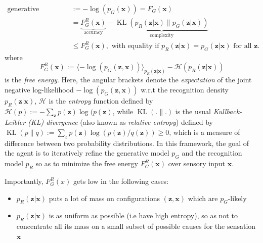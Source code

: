 \documentclass[10pt,letterpaper]{article}
\def\z{\mathbf{z}}
\def\x{\mathbf{x}}
\begin{document}
\begin{equation}
  \begin{split}
    \text{generative surprise } &:= -\log(p_G(\x)) = F_G(\x) \\
    &=\underbrace{F^R_G(\x)}_{\text{accuracy}} - \underbrace{\operatorname{{KL}}(p_R(\z|\x) \| p_G(\z|\x))}_{\text{complexity}} \\
    &\le F^R_G(\x),
    \text{ with equality if }p_R(\z|\x) = p_G(\z|\x)\text{ for all } \z.
  \end{split}
\end{equation}
where
\begin{equation}
  F_G^R(\x) := \langle -\log(p_G(\z, \x))\rangle_{p_R(\z|\x)} - \mathcal H(p_R(\z|\x))
\end{equation}
is the \textit{free energy}.
Here, the angular brackets denote the \textit{expectation} of the joint negative log-likelihood $-\log(p_G(\z, \x))$ w.r.t the recognition density $p_R(\z|\x)$, $\mathcal H$ is the \textit{entropy} function defined by $\mathcal H(p) := -\sum_{\z}p(\z)\log(p(\z)$, while $\operatorname{KL}(.\|.)$ is the usual \textit{Kullback-Leibler (KL) divergence} (also known as \textit{relative entropy}) defined by $\operatorname{KL}(p\|q) := \sum_{z}p(\z)\log(p(\z)/q(\z)) \ge 0$,
which is a measure of difference between two probability distributions. In this framework, the goal of the agent is to iteratively refine the generative model $p_G$ and the recognition model $p_R$ so as to minimize the free energy $F_G^R(\x)$ over sensory input $\x$.

Importantly, $F^R_G(x)$ gets low in the following cases:
\begin{itemize}
\item  $p_R(\z|\x)$ puts a lot of mass on configurations $(\z,\x)$ which are $p_G$-likely
\item $p_R(\z|\x)$ is as uniform as possible (i.e have high entropy), so as not to concentrate
  all its mass on a small subset of possible causes for the sensation $\x$
  \end{itemize}
\end{document}
